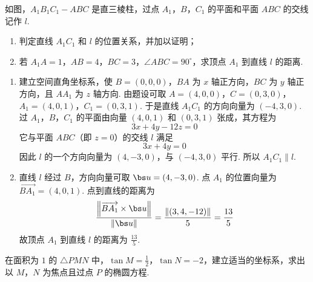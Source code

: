 \begin{problem}
如图，\(A_{1}B_{1}C_{1}-ABC\) 是直三棱柱，过点 \(A_{1}\)，\(B\)，\(C_{1}\) 的平面和平面 \(ABC\) 的交线记作 \(l\).

\begin{enumerate}
\item 判定直线 \(A_{1}C_{1}\) 和 \(l\) 的位置关系，并加以证明；
\item 若 \(A_{1}A = 1\)，\(AB = 4\)，\(BC = 3\)，\(\angle ABC = 90^{\circ}\)，求顶点 \(A_{1}\) 到直线 \(l\) 的距离.
\end{enumerate}

\end{problem}

\begin{solution}
\begin{enumerate}
\item 建立空间直角坐标系，使 \(B=(0,0,0)\)，\(BA\) 为 \(x\) 轴正方向，\(BC\) 为 \(y\) 轴正方向，且 \(AA_1\) 为 \(z\) 轴方向. 由题设可取
\(A=(4,0,0)\)，\(C=(0,3,0)\)，\(A_1=(4,0,1)\)，\(C_1=(0,3,1)\).
于是直线 \(A_1C_1\) 的方向向量为 \((-4,3,0)\). 过 \(A_1\)，\(B\)，\(C_1\) 的平面由向量 \((4,0,1)\) 和 \((0,3,1)\) 张成，其方程为
\[
3x+4y-12z=0
\]
它与平面 \(ABC\)（即 \(z=0\)）的交线 \(l\) 满足
\[
3x+4y=0
\]
因此 \(l\) 的一个方向向量为 \((4,-3,0)\)，与 \((-4,3,0)\) 平行. 所以 \(A_1C_1\parallel l\).

\item 直线 \(l\) 经过 \(B\)，方向向量可取 \(\bs u=(4,-3,0)\). 点 \(A_1\) 的位置向量为 \(\overrightarrow{BA_1}=(4,0,1)\). 点到直线的距离为
\[
\frac{\left\|\overrightarrow{BA_1}\times\bs u\right\|}{\left\|\bs u\right\|}
=\frac{\left\|(3,4,-12)\right\|}{5}
=\frac{13}{5}
\]
故顶点 \(A_1\) 到直线 \(l\) 的距离为 \(\frac{13}{5}\).
\end{enumerate}
\end{solution}

\begin{problem}
在面积为 \(1\) 的 \(\triangle PMN\) 中，\(\tan M = \frac{1}{2}\)，\(\tan N = -2\)，建立适当的坐标系，求出以 \(M\)，\(N\) 为焦点且过点 \(P\) 的椭圆方程.
\end{problem}

